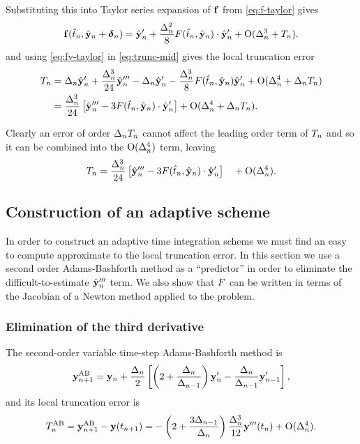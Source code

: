 Substituting this into Taylor series expansion of ${\mathbf{f}}$ from \eqref{eq:f-taylor} gives
\begin{equation}
  {\mathbf{f}}(\hat{t}_n, \hat{\mathbf{y}}_n + \mbox{\boldmath$\delta$}_{n}) = \hat{\mathbf{y}}_n'
  + \frac{\Delta_{n}^2}{8} F(\hat{t}_n, \hat{\mathbf{y}}_n) \cdot \hat{\mathbf{y}}_n' + \text{O}(\Delta_{n}^3 + T_n)
  . \label{eq:fy-taylor}
\end{equation}
and using \eqref{eq:fy-taylor} in \eqref{eq:trunc-mid} gives the local truncation error
\begin{align}
  T_n &= \Delta_{n} \hat{\mathbf{y}}_n' + \frac{\Delta_{n}^3}{24} \hat{\mathbf{y}}_n'''
  - \Delta_{n} \hat{\mathbf{y}}_n'
  - \frac{\Delta_{n}^3}{8} F(\hat{t}_n, \hat{\mathbf{y}}_n) \hat{\mathbf{y}}_n' + \text{O}(\Delta_{n}^4 + \Delta_{n}T_n) \notag \\
  &= \frac{\Delta_{n}^3}{24} \left[\hat{\mathbf{y}}_n''' - 3 F(\hat{t}_n, \hat{\mathbf{y}}_n) \cdot \hat{\mathbf{y}}_n' \right]
  + \text{O}(\Delta_{n}^4 + \Delta_{n}T_n).
  \label{eq:trunc-implicit-form}
\end{align}

Clearly an error of order $\Delta_{n} T_n$ cannot affect the leading order term of $T_n$ and so it can be combined into the $\text{O}(\Delta_{n}^4)$ term, leaving
\begin{equation}
   T_n = \frac{\Delta_{n}^3}{24} \left[\hat{\mathbf{y}}_n''' - 3 F(\hat{t}_n, \hat{\mathbf{y}}_n) \cdot \hat{\mathbf{y}}_n' \right]
   \quad +\text{O}(\Delta_{n}^4).
  \label{eq:trunc-final}
\end{equation}

\subsection{Construction of an adaptive scheme}

In order to construct an adaptive time integration scheme we must find an easy to compute approximate to the local truncation error.
In this section we use a second order Adams-Bashforth method as a ``predictor'' in order to eliminate the difficult-to-estimate $\hat{\mathbf{y}}_n'''$ term.\cite[p.707]{Gresho-Sani}
We also show that $F$ can be written in terms of the Jacobian of a Newton method applied to the problem.

\subsubsection{Elimination of the third derivative}
The second-order variable time-step Adams-Bashforth method is\cite[p.267]{Gresho-Sani}
\begin{equation}
  \mathbf{y}_{n+1}^{\text{AB}} = \mathbf{y}_n + \frac{\Delta_{n}}{2} \left[
    \left (2 + \frac{\Delta_{n}}{\Delta_{n-1}} \right) \mathbf{y}'_n
    - \frac{\Delta_{n}}{\Delta_{n-1}} \mathbf{y}'_{n-1}
    \right],
  \label{eq:AB2}
\end{equation}
and its local truncation error is\cite[p.267]{Gresho-Sani}
\begin{equation}
  T_n^{\text{AB}} = \mathbf{y}_{n+1}^{\text{AB}} - \mathbf{y}(t_{n+1})
  = - \left( 2 + \frac{3 \Delta_{n-1}}{\Delta_{n}} \right) \frac{\Delta_{n}^3}{12} \mathbf{y}'''(t_n)
  + \text{O}(\Delta_{n}^4).
  \label{eq:AB2LTE}
\end{equation}

